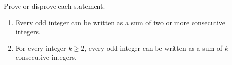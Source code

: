 Prove or disprove each statement.
\begin{enumerate}
\item[(a)] Every odd integer can be written as a sum of two or more consecutive integers.
\item[(b)] For every integer $k\ge2$, every odd integer can be written as a sum of $k$ consecutive integers.
\end{enumerate}
